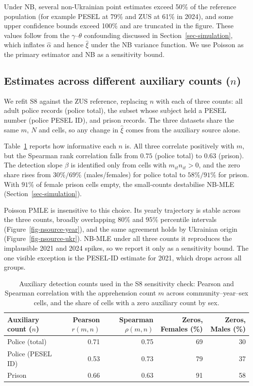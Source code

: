   Under NB, several non-Ukrainian point estimates exceed 50\% of the reference
  population (for example PESEL at 79\% and ZUS at 61\% in 2024), and some upper
  confidence bounds exceed 100\% and are truncated in the figure. These values
  follow from the $\gamma$--$\theta$ confounding discussed in
  Section~\ref{sec-simulation}, which inflates $\hat\alpha$ and hence
  $\hat\xi$ under the NB variance function. We use Poisson as the primary
  estimator and NB as a sensitivity bound.

\clearpage
\subsection{Estimates across different auxiliary counts ($n$)}\label{sec-appendix-auxiliary-counts}

We refit S8 against the ZUS reference, replacing $n$ with each of three counts: all adult police records (police total), the subset whose subject held a PESEL number (police PESEL ID), and prison records. The three datasets share the same $m$, $N$ and cells, so any change in $\hat\xi$ comes from the auxiliary source alone. 

Table~\ref{tbl-nsource-aux} reports how informative each $n$ is. All three correlate positively with $m$, but the Spearman rank correlation falls from $0.75$ (police total) to $0.63$ (prison). The detection slope $\beta$ is identified only from cells with $m_{it}n_{it}>0$, and the zero share rises from $30\%/69\%$ (males/females) for police total to $58\%/91\%$ for prison. With $91\%$ of female prison cells empty, the small-counts destabilise NB-MLE (Section~\ref{sec-simulation}).

Poisson PMLE is insensitive to this choice. Its yearly trajectory is stable across the three counts, broadly overlapping $80\%$ and $95\%$ percentile intervals (Figure~\ref{fig-nsource-year}), and the same agreement holds by Ukrainian origin (Figure~\ref{fig-nsource-ukr}). NB-MLE under all three counts it reproduces the implausible 2021 and 2024 spikes, so we report it only as a sensitivity bound. The one visible exception is the PESEL-ID estimate for 2021, which drops across all groups.
  
 \begin{table}[H]
\centering
\caption{\label{tbl-nsource-aux}Auxiliary detection counts used in the S8 sensitivity check: Pearson and Spearman correlation with the apprehension count $m$ across community--year--sex cells, and the share of cells with a zero auxiliary count by sex.}
\begin{tabular}{lrrrr} \toprule
Auxiliary count ($n$) & Pearson $r(m,n)$ & Spearman $\rho(m,n)$ & Zeros, Females (\%) & Zeros, Males (\%) \\ \midrule
Police (total) & 0.71 & 0.75 & 69 & 30 \\
Police (PESEL ID) & 0.53 & 0.73 & 79 & 37 \\
Prison & 0.66 & 0.63 & 91 & 58 \\
\bottomrule
\end{tabular}
\end{table}

